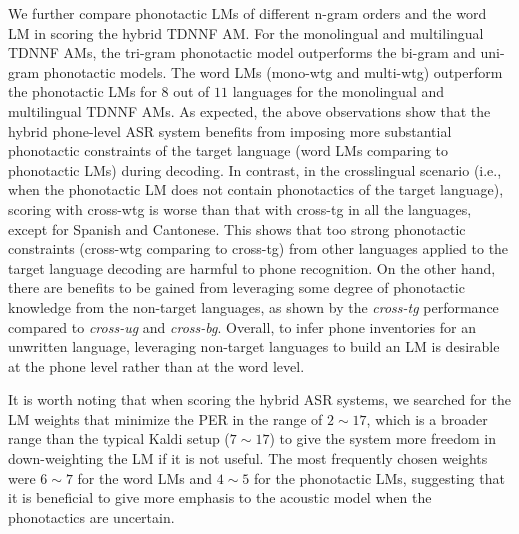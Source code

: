 \documentclass{article}
\begin{document}
We further compare phonotactic LMs of different n-gram orders and the word LM in scoring the hybrid TDNNF AM.
For the monolingual and multilingual TDNNF AMs, the tri-gram phonotactic model outperforms the bi-gram and uni-gram phonotactic models. The word LMs (mono-wtg and multi-wtg) outperform the phonotactic LMs for $8$ out of $11$ languages for the monolingual and multilingual TDNNF AMs. 
As expected, the above observations show that the hybrid phone-level ASR system benefits from imposing more substantial phonotactic constraints of the target language (word LMs comparing to phonotactic LMs) during decoding.
In contrast, in the crosslingual scenario (i.e., when the phonotactic LM does not contain phonotactics of the target language), scoring with cross-wtg is worse than that with cross-tg in all the languages, except for Spanish and Cantonese.
This shows that too strong phonotactic constraints (cross-wtg comparing to cross-tg) from other languages applied to the target language decoding are harmful to phone recognition.
On the other hand, there are benefits to be gained from leveraging some degree of phonotactic knowledge from the non-target languages, as shown by the \emph{cross-tg} performance compared to \emph{cross-ug} and \emph{cross-bg}.
Overall, to infer phone inventories for an unwritten language, leveraging non-target languages to build an LM is desirable at the phone level rather than at the word level.

It is worth noting that when scoring the hybrid ASR systems, we searched for the LM weights that minimize the PER in the range of $2 \sim 17$, which is a broader range than the typical Kaldi setup ($7 \sim 17$) to give the system more freedom in down-weighting the LM if it is not useful. The most frequently chosen weights were $6\sim7$ for the word LMs and $4\sim5$ for the phonotactic LMs, suggesting that it is beneficial to give more emphasis to the acoustic model when the phonotactics are uncertain.

\end{document}
